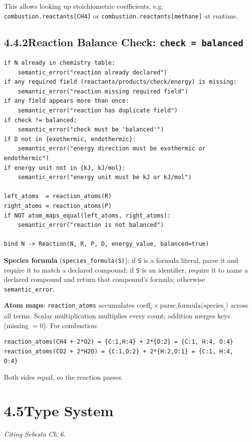 \documentclass[11pt,a4paper]{article}
\newcommand{\code}[1]{\texttt{#1}}
\begin{document}
This allows looking up stoichiometric coefficients, e.g. \code{combustion.reactants[CH4]} or \code{combustion.reactants[methane]} at runtime.

\subsection{4.4.2\quad Reaction Balance Check: \code{check = balanced}}

\begin{lstlisting}[style=sem]
if N already in chemistry table:
    semantic_error("reaction already declared")
if any required field (reactants/products/check/energy) is missing:
    semantic_error("reaction missing required field")
if any field appears more than once:
    semantic_error("reaction has duplicate field")
if check != balanced:
    semantic_error("check must be 'balanced'")
if D not in {exothermic, endothermic}:
    semantic_error("energy direction must be exothermic or endothermic")
if energy unit not in {kJ, kJ/mol}:
    semantic_error("energy unit must be kJ or kJ/mol")

left_atoms  = reaction_atoms(R)
right_atoms = reaction_atoms(P)
if NOT atom_maps_equal(left_atoms, right_atoms):
    semantic_error("reaction is not balanced")

bind N -> Reaction(N, R, P, D, energy_value, balanced=true)
\end{lstlisting}

\textbf{Species formula} (\code{species\_formula(S)}): if \code{S} is a formula literal, parse it and require it to match a declared compound; if \code{S} is an identifier, require it to name a declared compound and return that compound's formula; otherwise \code{semantic\_error}.

\textbf{Atom maps}: \code{reaction\_atoms} accumulates $\mathrm{coeff}_i \times \mathrm{parse\_formula(species}_i)$ across all terms. Scalar multiplication multiplies every count; addition merges keys (missing $= 0$). For combustion:

\begin{lstlisting}[style=sem]
reaction_atoms(CH4 + 2*O2) = {C:1,H:4} + 2*{O:2} = {C:1, H:4, O:4}
reaction_atoms(CO2 + 2*H2O) = {C:1,O:2} + 2*{H:2,O:1} = {C:1, H:4, O:4}
\end{lstlisting}

Both sides equal, so the reaction passes.

\newpage
\section{4.5\quad Type System}
\textit{Citing Sebesta Ch.\,6.}
\end{document}
